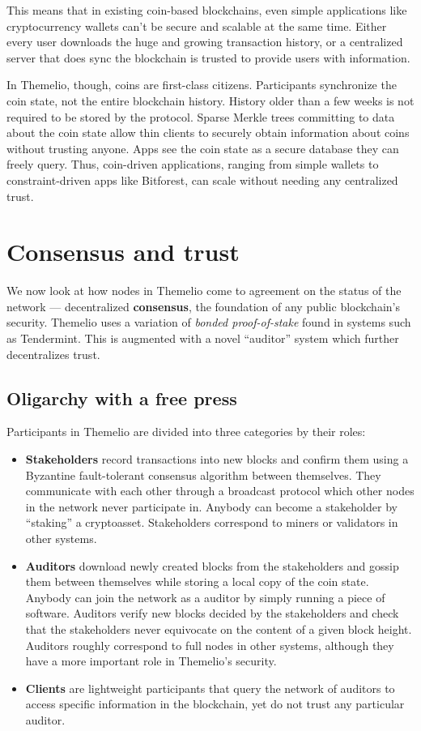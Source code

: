 \documentclass[headinclude]{scrbook}
\begin{document}
This means that in existing coin-based blockchains, even simple applications like cryptocurrency wallets can't be secure and scalable at the same time. Either every user downloads the huge and growing transaction history, or a centralized server that does sync the blockchain is trusted to provide users with information.

In Themelio, though, coins are first-class citizens. Participants synchronize the coin state, not the entire blockchain history. History older than a few weeks is not required to be stored by the protocol. Sparse Merkle trees committing to data about the coin state allow thin clients to securely obtain information about coins without trusting anyone. Apps see the coin state as a secure database they can freely query. Thus, coin-driven applications, ranging from simple wallets to constraint-driven apps like Bitforest, can scale without needing any centralized trust.

\section{Consensus and trust}

We now look at how nodes in Themelio come to agreement on the status of the network --- decentralized \textbf{consensus}, the foundation of any public blockchain's security. Themelio uses a variation of \emph{bonded proof-of-stake} found in systems such as Tendermint. This is augmented with a novel ``auditor'' system which further decentralizes trust.

\subsection{Oligarchy with a free press}

Participants in Themelio are divided into three categories by their roles:

\begin{itemize}
    \item \textbf{Stakeholders} record transactions into new blocks and confirm them using a Byzantine fault-tolerant consensus algorithm between themselves. They communicate with each other through a broadcast protocol which other nodes in the network never participate in. Anybody can become a stakeholder by ``staking'' a cryptoasset. Stakeholders correspond to miners or validators in other systems.
    \item \textbf{Auditors} download newly created blocks from the stakeholders and gossip them between themselves while storing a local copy of the coin state. Anybody can join the network as a auditor by simply running a piece of software. Auditors verify new blocks decided by the stakeholders and check that the stakeholders never equivocate on the content of a given block height. Auditors roughly correspond to full nodes in other systems, although they have a more important role in Themelio's security.
    \item \textbf{Clients} are lightweight participants that query the network of auditors to access specific information in the blockchain, yet do not trust any particular auditor.
\end{itemize}
\end{document}
